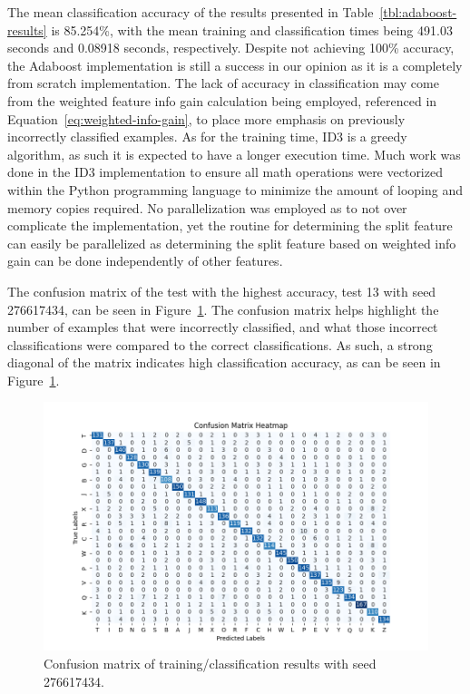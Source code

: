 \documentclass[a4paper]{article}
\begin{document}
The mean classification accuracy of the results presented in Table~\ref{tbl:adaboost-results} is 85.254\%, with the mean training and classification times being 491.03 seconds and 0.08918 seconds, respectively. Despite not achieving 100\% accuracy, the Adaboost implementation is still a success in our opinion as it is a completely from scratch implementation. The lack of accuracy in classification may come from the weighted feature info gain calculation being employed, referenced in Equation~\ref{eq:weighted-info-gain}, to place more emphasis on previously incorrectly classified examples. As for the training time, ID3 is a greedy algorithm, as such it is expected to have a longer execution time. Much work was done in the ID3 implementation to ensure all math operations were vectorized within the Python programming language to minimize the amount of looping and memory copies required. No parallelization was employed as to not over complicate the implementation, yet the routine for determining the split feature can easily be parallelized as determining the split feature based on weighted info gain can be done independently of other features.

The confusion matrix of the test with the highest accuracy, test 13 with seed 276617434, can be seen in Figure~\ref{fig:confusion-matrix}. The confusion matrix helps highlight the number of examples that were incorrectly classified, and what those incorrect classifications were compared to the correct classifications. As such, a strong diagonal of the matrix indicates high classification accuracy, as can be seen in Figure~\ref{fig:confusion-matrix}.

\begin{figure}[h!]
    \centering
    \includegraphics[scale=0.65]{images/confusion-matrix.png}
    \caption{Confusion matrix of training/classification results with seed 276617434.}
    \label{fig:confusion-matrix}
\end{figure}
\end{document}
